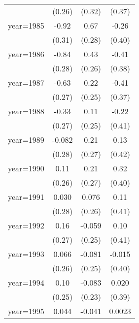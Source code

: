 \begin{sidewaystable}[htbp]
\begin{tabular}{l*{3}{c}}
                &   (0.26)         &   (0.32)         &   (0.37)         \\
\addlinespace
year=1985       &    -0.92\sym{***}&     0.67\sym{**} &    -0.26         \\
                &   (0.31)         &   (0.28)         &   (0.40)         \\
\addlinespace
year=1986       &    -0.84\sym{***}&     0.43         &    -0.41         \\
                &   (0.28)         &   (0.26)         &   (0.38)         \\
\addlinespace
year=1987       &    -0.63\sym{**} &     0.22         &    -0.41         \\
                &   (0.27)         &   (0.25)         &   (0.37)         \\
\addlinespace
year=1988       &    -0.33         &     0.11         &    -0.22         \\
                &   (0.27)         &   (0.25)         &   (0.41)         \\
\addlinespace
year=1989       &   -0.082         &     0.21         &     0.13         \\
                &   (0.28)         &   (0.27)         &   (0.42)         \\
\addlinespace
year=1990       &     0.11         &     0.21         &     0.32         \\
                &   (0.26)         &   (0.27)         &   (0.40)         \\
\addlinespace
year=1991       &    0.030         &    0.076         &     0.11         \\
                &   (0.28)         &   (0.26)         &   (0.41)         \\
\addlinespace
year=1992       &     0.16         &   -0.059         &     0.10         \\
                &   (0.27)         &   (0.25)         &   (0.41)         \\
\addlinespace
year=1993       &    0.066         &   -0.081         &   -0.015         \\
                &   (0.26)         &   (0.25)         &   (0.40)         \\
\addlinespace
year=1994       &     0.10         &   -0.083         &    0.020         \\
                &   (0.25)         &   (0.23)         &   (0.39)         \\
\addlinespace
year=1995       &    0.044         &   -0.041         &   0.0023         \\

\end{tabular}
\end{sidewaystable}
